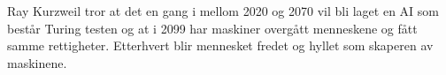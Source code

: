 Ray Kurzweil tror at det en gang i mellom 2020 og 2070 vil bli laget en AI som består Turing testen og at i 2099 har maskiner overgått menneskene og fått samme rettigheter. Etterhvert blir mennesket fredet og hyllet som skaperen av maskinene.